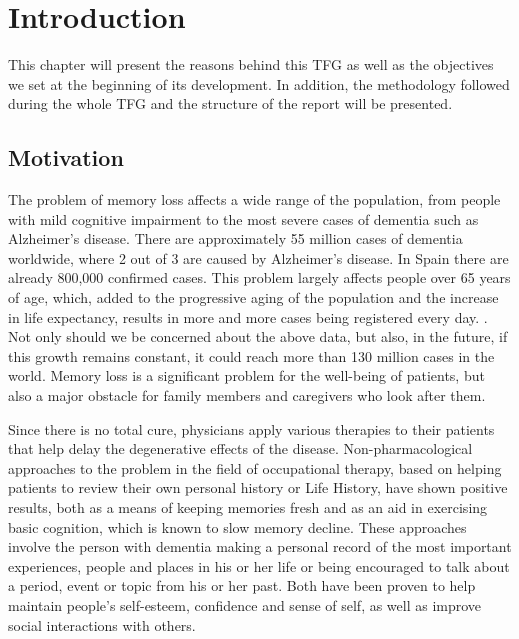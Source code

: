 
\chapter{Introduction}
\label{cap:introduction}


This chapter will present the reasons behind this TFG as well as the objectives we set at the beginning of its development. In addition, the methodology followed during the whole TFG and the structure of the report will be presented.



\section{Motivation}
The problem of memory loss affects a wide range of the population, from people with mild cognitive impairment to the most severe cases of dementia such as Alzheimer's disease. There are approximately 55 million cases of dementia worldwide, where 2 out of 3 are caused by Alzheimer's disease. In Spain there are already 800,000 confirmed cases. This problem largely affects people over 65 years of age, which, added to the progressive aging of the population and the increase in life expectancy, results in more and more cases being registered every day. \citep{article_2}. Not only should we be concerned about the above data, but also, in the future, if this growth remains constant, it could reach more than 130 million cases in the world. Memory loss is a significant problem for the well-being of patients, but also a major obstacle for family members and caregivers who look after them.

Since there is no total cure, physicians apply various therapies to their patients that help delay the degenerative effects of the disease. Non-pharmacological approaches to the problem in the field of occupational therapy, based on helping patients to review their own personal history or Life History, have shown positive results, both as a means of keeping memories fresh and as an aid in exercising basic cognition, which is known to slow memory decline. These approaches involve the person with dementia making a personal record of the most important experiences, people and places in his or her life or being encouraged to talk about a period, event or topic from his or her past. Both have been proven to help maintain people's self-esteem, confidence and sense of self, as well as improve social interactions with others.

